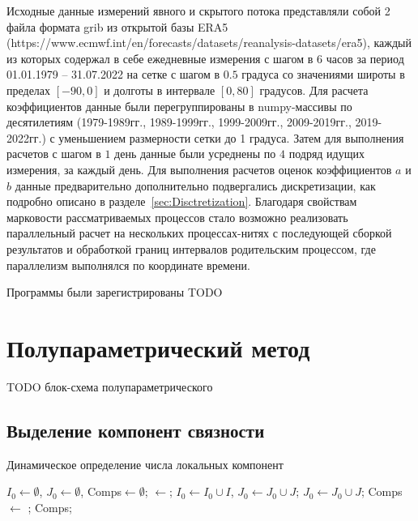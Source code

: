Исходные данные измерений явного и скрытого потока представляли собой 2 файла формата grib из открытой базы ERA5 (https://www.ecmwf.int/en/forecasts/datasets/reanalysis-datasets/era5), каждый из которых содержал в себе ежедневные измерения с шагом в $6$ часов за период 01.01.1979 -- 31.07.2022 на сетке с шагом в $0.5$ градуса со значениями широты в пределах $[-90, 0]$ и долготы в интервале $[0, 80]$ градусов. Для расчета коэффициентов данные были перегруппированы в numpy-массивы по десятилетиям (1979-1989гг., 1989-1999гг., 1999-2009гг., 2009-2019гг., 2019-2022гг.) с уменьшением размерности сетки до 1 градуса. Затем для выполнения расчетов с шагом в $1$ день данные были усреднены по $4$ подряд идущих измерения, за каждый день. Для выполнения расчетов оценок коэффициентов $a$ и $b$ данные предварительно дополнительно подвергались дискретизации, как подробно описано в разделе~\ref{sec:Disctretization}. Благодаря свойствам марковости рассматриваемых процессов стало возможно реализовать параллельный расчет на нескольких процессах-нитях с последующей сборкой результатов и обработкой границ интервалов родительским процессом, где параллелизм выполнялся по координате времени. 

Программы были зарегистрированы TODO \cite{progbib1, progbib2}

\section{Полупараметрический метод}
\label{sec:AlgoSemiparametric}
TODO блок-схема полупараметрического

\subsection{Выделение компонент связности}
\label{sec:ComponentsAlgo}
\begin{algorithm}[!h]
	\caption{Динамическое определение числа локальных компонент}
	\label{AlgGreedy}
	\begin{algorithmic}[1]
		\State  $I_0\gets \emptyset$, $J_0\gets \emptyset$, Comps$\gets \emptyset$;
		\Repeat {}
		\State {}
		\State [I, J]$\gets$;
		\State $I_0\gets I_0\cup I$, $J_0\gets J_0\cup J$;
		\Else{}
		\State $J_0\gets J_0\cup J$;
		\State Comps $\gets$ ;
		\EndIf
		\State \Return Comps;
		\EndFunction
	\end{algorithmic}
\end{algorithm}

